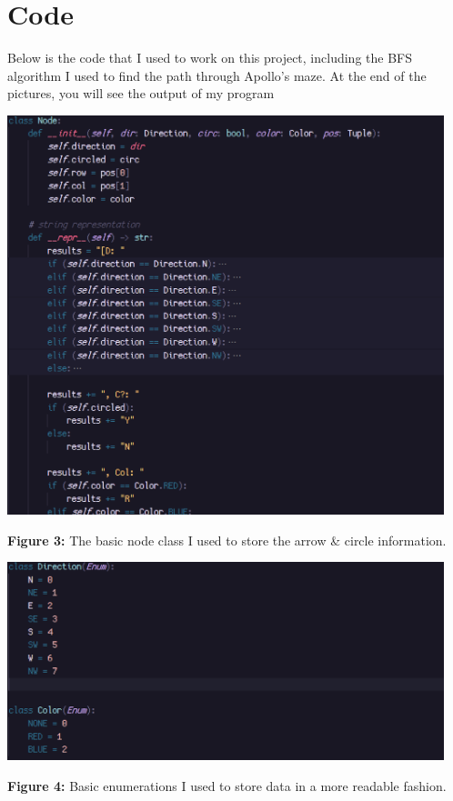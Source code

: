 \documentclass[12pt]{article}
\begin{document}
\section{Code}
Below is the code that I used to work on this project, including the BFS
algorithm I used to find the path through Apollo's maze. At the end of the
pictures, you will see the output of my program
\begin{center}
    \includegraphics[width=5in]{node.png}

    \textbf{Figure 3:} The basic node class I used to store the arrow \& circle
    information.

    \includegraphics[width=5in]{properties.png}

    \textbf{Figure 4:} Basic enumerations I used to store data in a more
    readable fashion.


\end{center}
\end{document}
